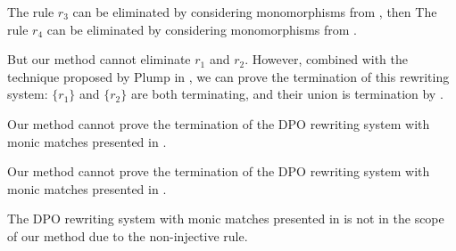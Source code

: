\begin{example}
  The rule $r_3$ can be eliminated by considering monomorphisms from  , then The rule $r_4$ can be eliminated by considering monomorphisms from  .

But our method cannot eliminate $r_1$ and $r_2$. However, combined with the technique proposed by Plump in \cite{plump2018modular}, we can prove the termination of this rewriting system: $\{r_1\}$ and $\{r_2\}$ are both terminating, and their union is termination by \cite{plump2018modular}.
\end{example}

\begin{example}
  \label{ex:bruggink2015_ex5}
  Our method cannot prove the termination of the DPO rewriting system with monic matches presented in \cite[Example 5]{bruggink2015proving}. 
\end{example}
\begin{example}
  \label{ex:bruggink2015_ex6_endrullis2024_d2}
  Our method cannot prove the termination of the DPO rewriting system with monic matches presented in \cite[Example 6]{bruggink2015proving}. 
\end{example}

\begin{example}
  \label{ex:plump2018_ex6_endrullis_d4}
  The DPO rewriting system with monic matches presented in \cite[Example 6]{plump2018modular} is not in the scope of our method due to the non-injective rule.
\end{example}


